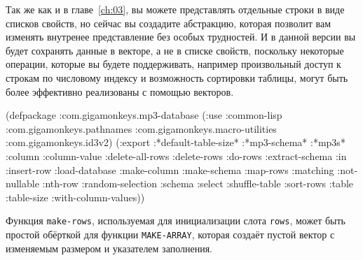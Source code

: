 Так же как и в главе~\ref{ch:03}, вы можете представлять отдельные строки в виде списков
свойств, но сейчас вы создадите абстракцию, которая позволит вам изменять внутренее
представление без особых трудностей. И в данной версии вы будет сохранять данные в
векторе, а не в списке свойств, поскольку некоторые операции, которые вы будете
поддерживать, например произвольный доступ к строкам по числовому индексу и возможность
сортировки таблицы, могут быть более эффективно реализованы с помощью векторов.

\begin{lrbox}{\chtwosevenone}
  \begin{minipage}{\linewidth}
\begin{myverb}
(defpackage :com.gigamonkeys.mp3-database
  (:use :common-lisp 
        :com.gigamonkeys.pathnames
        :com.gigamonkeys.macro-utilities
        :com.gigamonkeys.id3v2)
  (:export  :*default-table-size*
            :*mp3-schema*
            :*mp3s*
            :column
            :column-value
            :delete-all-rows
            :delete-rows
            :do-rows
            :extract-schema
            :in
            :insert-row
            :load-database
            :make-column
            :make-schema
            :map-rows
            :matching
            :not-nullable
            :nth-row
            :random-selection
            :schema
            :select
            :shuffle-table
            :sort-rows
            :table
            :table-size
            :with-column-values))
\end{myverb}
  \end{minipage}
\end{lrbox}


Функция \lstinline{make-rows}, используемая для инициализации слота \lstinline{rows}, может быть
прос\-той обёрткой для функции \lstinline{MAKE-ARRAY}, которая создаёт пустой вектор с изменяемым
размером и указателем заполнения.


